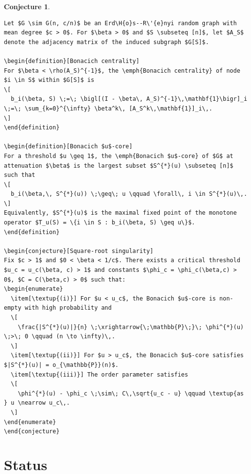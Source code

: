 \documentclass[11pt]{article}
\newtheorem{conjecture}{Conjecture}
\begin{document}
\begin{conjecture}
\begin{lstlisting}
Let $G \sim G(n, c/n)$ be an Erd\H{o}s--R\'{e}nyi random graph with mean degree $c > 0$. For $\beta > 0$ and $S \subseteq [n]$, let $A_S$ denote the adjacency matrix of the induced subgraph $G[S]$.

\begin{definition}[Bonacich centrality]
For $\beta < \rho(A_S)^{-1}$, the \emph{Bonacich centrality} of node $i \in S$ within $G[S]$ is
\[
  b_i(\beta, S) \;=\; \bigl[(I - \beta\, A_S)^{-1}\,\mathbf{1}\bigr]_i \;=\; \sum_{k=0}^{\infty} \beta^k\, [A_S^k\,\mathbf{1}]_i\,.
\]
\end{definition}

\begin{definition}[Bonacich $u$-core]
For a threshold $u \geq 1$, the \emph{Bonacich $u$-core} of $G$ at attenuation $\beta$ is the largest subset $S^{*}(u) \subseteq [n]$ such that
\[
  b_i(\beta,\, S^{*}(u)) \;\geq\; u \qquad \forall\, i \in S^{*}(u)\,.
\]
Equivalently, $S^{*}(u)$ is the maximal fixed point of the monotone operator $T_u(S) = \{i \in S : b_i(\beta, S) \geq u\}$.
\end{definition}

\begin{conjecture}[Square-root singularity]
Fix $c > 1$ and $0 < \beta < 1/c$. There exists a critical threshold $u_c = u_c(\beta, c) > 1$ and constants $\phi_c = \phi_c(\beta,c) > 0$, $C = C(\beta,c) > 0$ such that:
\begin{enumerate}
  \item[\textup{(i)}] For $u < u_c$, the Bonacich $u$-core is non-empty with high probability and
  \[
    \frac{|S^{*}(u)|}{n} \;\xrightarrow{\;\mathbb{P}\;}\; \phi^{*}(u) \;>\; 0 \qquad (n \to \infty)\,.
  \]
  \item[\textup{(ii)}] For $u > u_c$, the Bonacich $u$-core satisfies $|S^{*}(u)| = o_{\mathbb{P}}(n)$.
  \item[\textup{(iii)}] The order parameter satisfies
  \[
    \phi^{*}(u) - \phi_c \;\sim\; C\,\sqrt{u_c - u} \qquad \textup{as } u \nearrow u_c\,.
  \]
\end{enumerate}
\end{conjecture}
\end{lstlisting}
\end{conjecture}

\section{Status}
\end{document}
